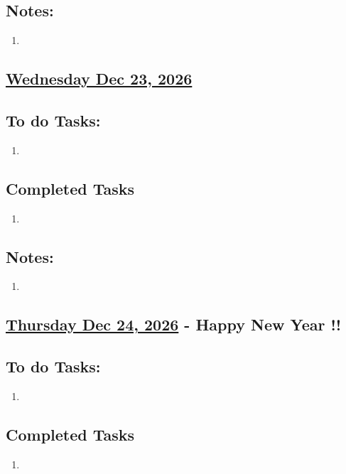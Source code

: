 \subsection*{Notes:}
\begin{enumerate}
    \item 
\end{enumerate}
\subsection*{\underline{Wednesday Dec 23, 2026} }
\subsection*{To do Tasks:}
\begin{enumerate}
    \item 
\end{enumerate}
\subsection*{Completed Tasks}
\begin{enumerate}[\ding{52}]  %
    \item 
\end{enumerate}
\subsection*{Notes:}
\begin{enumerate}
    \item 
\end{enumerate}
\subsection*{\underline{Thursday Dec 24, 2026} -  Happy New Year !!}
\subsection*{To do Tasks:}
\begin{enumerate}
    \item
\end{enumerate}
\subsection*{Completed Tasks}
\begin{enumerate}[\ding{52}]  %
    \item 
\end{enumerate}
